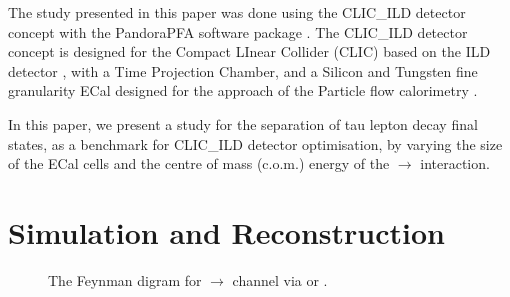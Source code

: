 \documentclass[a4paper,11pt]{article}
\begin{document}


The study presented in this paper was done using the CLIC\_ILD detector concept with the PandoraPFA software package . The CLIC\_ILD detector concept \cite{Linssen:2012hp} is designed for the Compact LInear Collider (CLIC) based on the ILD detector \cite{Abe:2010aa}, with a Time Projection Chamber, and a Silicon and Tungsten fine granularity ECal designed for the approach of the Particle flow calorimetry \cite{Marshall:2012ry}.



In this paper, we present a study for the separation of tau lepton decay final states, as a benchmark for CLIC\_ILD detector optimisation, by varying the size of the ECal cells and the centre of mass (c.o.m.) energy of the \Pelectron\APelectron $\to$ \Ptauon\APtauon interaction.


\section{Simulation and Reconstruction}


\begin{figure}[htbp]
\centering %
\caption{\label{fig:feynman} The Feynman digram for \Pelectron\APelectron $\to$ \Ptauon\APtauon channel via \Pphoton or \PZzero.}
\end{figure}
\end{document}
